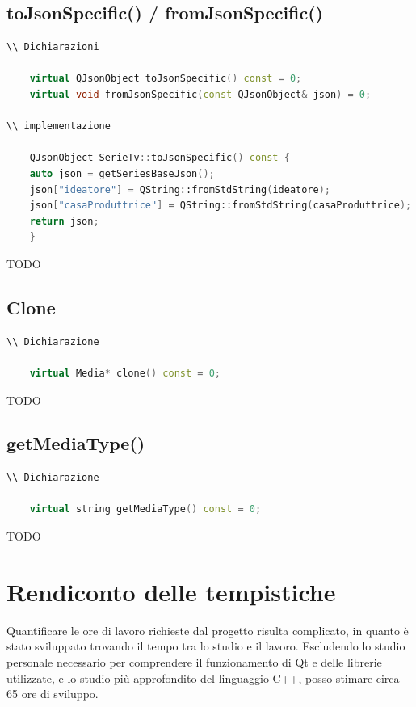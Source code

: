 \documentclass[a4paper,12pt]{article}
\begin{document}
\subsection{toJsonSpecific() / fromJsonSpecific()}

\begin{lstlisting}[language=cpp, style=cppstyle]
\\ Dichiarazioni

    virtual QJsonObject toJsonSpecific() const = 0;
    virtual void fromJsonSpecific(const QJsonObject& json) = 0;

\\ implementazione

    QJsonObject SerieTv::toJsonSpecific() const {
    auto json = getSeriesBaseJson();
    json["ideatore"] = QString::fromStdString(ideatore);
    json["casaProduttrice"] = QString::fromStdString(casaProduttrice);
    return json;
    }
\end{lstlisting}

TODO
\subsection{Clone}

\begin{lstlisting}[language=cpp, style=cppstyle]
\\ Dichiarazione

    virtual Media* clone() const = 0;
\end{lstlisting}

TODO

\subsection{getMediaType()}

\begin{lstlisting}[language=cpp, style=cppstyle]
\\ Dichiarazione

    virtual string getMediaType() const = 0;
\end{lstlisting}

TODO


\section{Rendiconto delle tempistiche}
Quantificare le ore di lavoro richieste dal progetto risulta complicato, in quanto è stato sviluppato trovando il tempo tra lo studio e il lavoro. Escludendo lo studio personale necessario per comprendere il funzionamento di Qt e delle librerie utilizzate, e lo studio più approfondito del linguaggio C++, posso stimare circa 65 ore di sviluppo.
\end{document}
